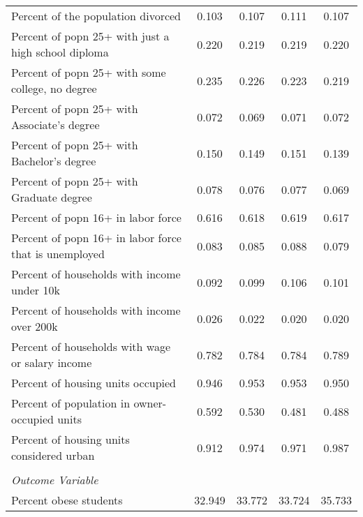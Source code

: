 {\begin{tabular}{l*{4}{c}}
Percent of the population divorced&       0.103&       0.107&       0.111&       0.107\\
Percent of popn 25+ with just a high school diploma&       0.220&       0.219&       0.219&       0.220\\
Percent of popn 25+ with some college, no degree&       0.235&       0.226&       0.223&       0.219\\
Percent of popn 25+ with Associate's degree&       0.072&       0.069&       0.071&       0.072\\
Percent of popn 25+ with Bachelor's degree&       0.150&       0.149&       0.151&       0.139\\
Percent of popn 25+ with Graduate degree&       0.078&       0.076&       0.077&       0.069\\
Percent of popn 16+ in labor force&       0.616&       0.618&       0.619&       0.617\\
Percent of popn 16+ in labor force that is unemployed&       0.083&       0.085&       0.088&       0.079\\
Percent of households with income under 10k&       0.092&       0.099&       0.106&       0.101\\
Percent of households with income over 200k&       0.026&       0.022&       0.020&       0.020\\
Percent of households with wage or salary income&       0.782&       0.784&       0.784&       0.789\\
Percent of housing units occupied&       0.946&       0.953&       0.953&       0.950\\
Percent of population in owner-occupied units&       0.592&       0.530&       0.481&       0.488\\
Percent of housing units considered urban&       0.912&       0.974&       0.971&       0.987\\
\\  \textit{Outcome Variable} &            &            &            &            \\
Percent obese students&      32.949&      33.772&      33.724&      35.733\\
\hline\hline
\end{tabular}
}
